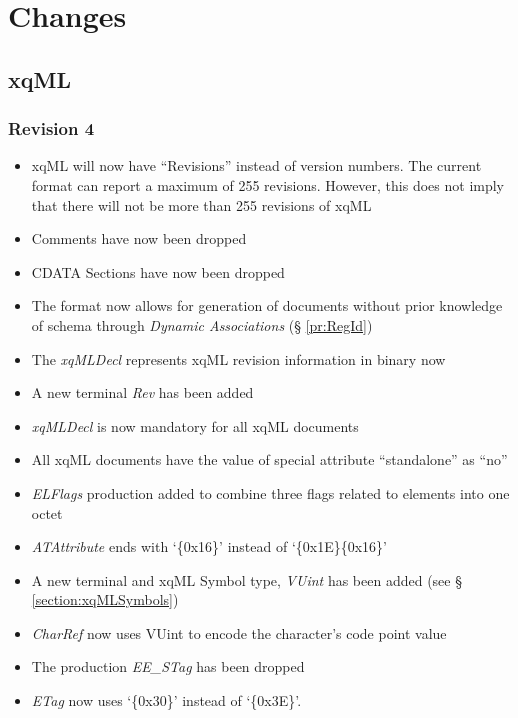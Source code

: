 \documentclass[a4paper]{article}
\begin{document}
\section{Changes}

\subsection{xqML}
\subsubsection{Revision 4} \label{subsubsection:changesRev4}
\begin{itemize}
\item xqML will now have ``Revisions'' instead of version numbers. The
  current format can report a maximum of 255 revisions. However, this
  does not imply that there will not be more than 255 revisions of
  xqML
\item Comments have now been dropped
\item CDATA Sections have now been dropped
\item The format now allows for generation of documents without prior
  knowledge of schema through {\it Dynamic Associations} (\S{}
  \ref{pr:RegId})
\item The {\it xqMLDecl} represents xqML revision information in
  binary now
\item A new terminal {\it Rev} has been added
\item {\it xqMLDecl} is now mandatory for all xqML documents
\item All xqML documents have the value of special attribute
  ``standalone'' as ``no''
\item {\it ELFlags} production added to combine three flags related to
  elements into one octet
\item {\it ATAttribute} ends with `\{0x16\}' instead of
  `\{0x1E\}\{0x16\}'
\item A new terminal and xqML Symbol type, {\it VUint} has been added
  (see \S{} \ref{section:xqMLSymbols})
\item {\it CharRef} now uses VUint to encode the character's code
  point value
\item The production {\it EE\_STag} has been dropped
\item {\it ETag} now uses `\{0x30\}' instead of `\{0x3E\}'.
\end{itemize}
\end{document}
